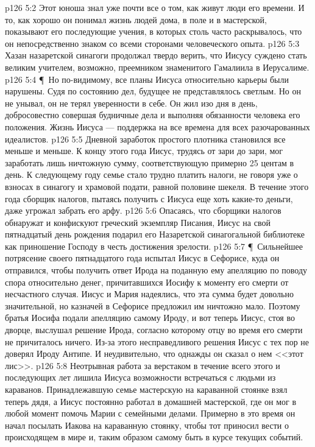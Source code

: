 \vs p126 5:2 Этот юноша знал уже почти все о том, как живут люди его времени. И то, как хорошо он понимал жизнь людей дома, в поле и в мастерской, показывают его последующие учения, в которых столь часто раскрывалось, что он непосредственно знаком со всеми сторонами человеческого опыта.
\vs p126 5:3 Хазан назаретской синагоги продолжал твердо верить, что Иисусу суждено стать великим учителем, возможно, преемником знаменитого Гамалиила в Иерусалиме.
\vs p126 5:4 \P\ Но по\hyp{}видимому, все планы Иисуса относительно карьеры были нарушены. Судя по состоянию дел, будущее не представлялось светлым. Но он не унывал, он не терял уверенности в себе. Он жил изо дня в день, добросовестно совершая будничные дела и выполняя  обязанности человека его положения. Жизнь Иисуса --- поддержка на все времена для всех разочарованных идеалистов.
\vs p126 5:5 Дневной заработок простого плотника становился все меньше и меньше. К концу этого года Иисус, трудясь от зари до зари, мог заработать лишь ничтожную сумму, соответствующую примерно 25 центам в день. К следующему году семье стало трудно платить налоги, не говоря уже о взносах в синагогу и храмовой подати, равной половине шекеля. В течение этого года сборщик налогов, пытаясь получить с Иисуса еще хоть какие\hyp{}то деньги, даже угрожал забрать его арфу.
\vs p126 5:6 Опасаясь, что сборщики налогов обнаружат и конфискуют греческий экземпляр Писания, Иисус на свой пятнадцатый день рождения подарил его Назаретской синагогальной библиотеке как приношение Господу в честь достижения зрелости.
\vs p126 5:7 \P\ Сильнейшее потрясение своего пятнадцатого года испытал Иисус в Сефорисе, куда он отправился, чтобы получить ответ Ирода на поданную ему апелляцию по поводу спора относительно денег, причитавшихся Иосифу к моменту его смерти от несчастного случая. Иисус и Мария надеялись, что эта сумма будет довольно значительной, но казначей в Сефорисе предложил им ничтожно мало. Поэтому братья Иосифа подали апелляцию самому Ироду, и вот теперь Иисус, стоя во дворце, выслушал решение Ирода, согласно которому отцу во время его смерти не причиталось ничего. Из\hyp{}за этого несправедливого решения Иисус с тех пор не доверял Ироду Антипе. И неудивительно, что однажды он сказал о нем <<этот лис>>.
\vs p126 5:8 Неотрывная работа за верстаком в течение всего этого и последующих лет лишила Иисуса возможности встречаться с людьми из караванов. Принадлежавшую семье мастерскую на караванной стоянке взял теперь дядя, а Иисус постоянно работал в домашней мастерской, где он мог в любой момент помочь Марии с семейными делами. Примерно в это время он начал посылать Иакова на караванную стоянку, чтобы тот приносил вести о происходящем в мире и, таким образом самому быть в курсе текущих событий.
